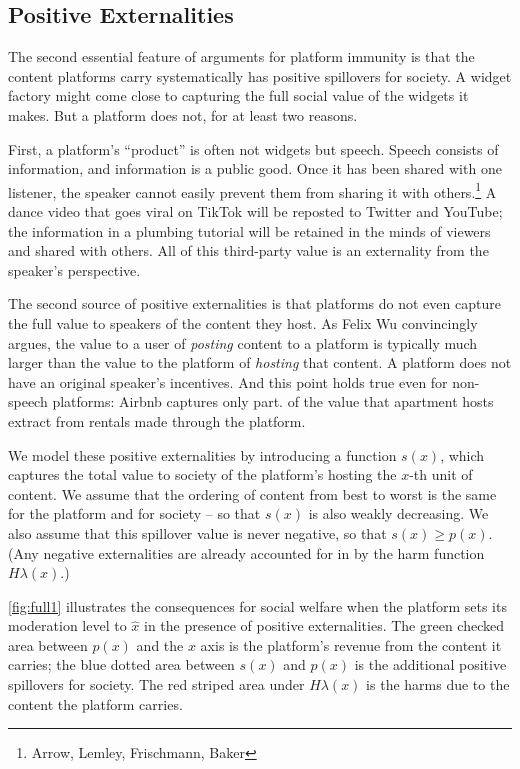 \subsection{Positive Externalities}

The second essential feature of arguments for platform immunity is that the content platforms carry systematically has positive spillovers for society. A widget factory might come close to capturing the full social value of the widgets it makes. But a platform does not, for at least two reasons.

First, a platform's ``product'' is often not widgets but speech. Speech consists of information, and information is a public good. Once it has been shared with one listener, the speaker cannot easily prevent them from sharing it with others.\footnote{Arrow, Lemley, Frischmann, Baker} A dance video that goes viral on TikTok will be reposted to Twitter and YouTube; the information in a plumbing tutorial will be retained in the minds of viewers and shared with others. All of this third-party value is an externality from the speaker's perspective.

The second source of positive externalities is that platforms do not even capture the full value to speakers of the content they host. As Felix Wu convincingly argues, the value to a user of \emph{posting} content to a platform is typically much larger than the value to the platform of \emph{hosting} that content. A platform does not have an original speaker's incentives. And this point holds true even for non-speech platforms: Airbnb captures only part. of the value that apartment hosts extract from rentals made through the platform.

We model these positive externalities by introducing a function $s(x)$, which captures the total value to society of the platform's hosting the $x$-th unit of content. We assume that the ordering of content from best to worst is the same for the platform and for society -- so that $s(x)$ is also weakly decreasing. We also assume that this spillover value is never negative, so that $s(x) \ge p(x)$. (Any negative externalities are already accounted for in by the harm function $H\lambda(x)$.)

\autoref{fig:full1} illustrates the consequences for social welfare when the platform sets its moderation level to $\hat{x}$ in the presence of positive externalities. The green checked area between $p(x)$ and the $x$ axis is the platform's revenue from the content it carries; the blue dotted area between $s(x)$ and $p(x)$ is the additional positive spillovers for society. The red striped area under $H\lambda(x)$ is the harms due to the content the platform carries.



